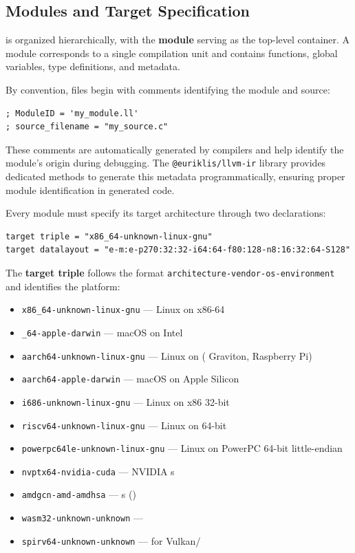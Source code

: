 \subsection{Modules and Target Specification}

  is organized hierarchically, with the \textbf{module} serving as the top-level container. A module corresponds to a single compilation unit and contains functions, global variables, type definitions, and metadata.

By convention,   files begin with comments identifying the module and source:

\begin{lstlisting}[style=ir]
; ModuleID = 'my_module.ll'
; source_filename = "my_source.c"
\end{lstlisting}

These comments are automatically generated by compilers and help identify the module's origin during debugging. The \texttt{@euriklis/llvm-ir} library provides dedicated methods to generate this metadata programmatically, ensuring proper module identification in generated code.

Every module must specify its target architecture through two declarations:

\begin{lstlisting}[style=ir]
target triple = "x86_64-unknown-linux-gnu"
target datalayout = "e-m:e-p270:32:32-i64:64-f80:128-n8:16:32:64-S128"
\end{lstlisting}

The \textbf{target triple} follows the format \texttt{architecture-vendor-os-environment} and identifies the platform:

\begin{itemize}[noitemsep]
  \item \texttt{x86\_64-unknown-linux-gnu} --- Linux on x86-64
  \item \texttt{\_64-apple-darwin} --- macOS on Intel
  \item \texttt{aarch64-unknown-linux-gnu} --- Linux on  ( Graviton, Raspberry Pi)
  \item \texttt{aarch64-apple-darwin} --- macOS on Apple Silicon
  \item \texttt{i686-unknown-linux-gnu} --- Linux on x86 32-bit
  \item \texttt{riscv64-unknown-linux-gnu} --- Linux on  64-bit
  \item \texttt{powerpc64le-unknown-linux-gnu} --- Linux on PowerPC 64-bit little-endian
  \item \texttt{nvptx64-nvidia-cuda} --- NVIDIA s
  \item \texttt{amdgcn-amd-amdhsa} ---  s ()
  \item \texttt{wasm32-unknown-unknown} --- 
  \item \texttt{spirv64-unknown-unknown} ---  for Vulkan/
\end{itemize}

